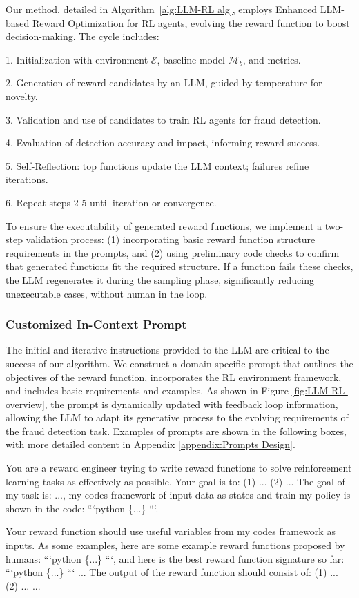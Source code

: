 \documentclass[11pt]{article}
\begin{document}
Our method, detailed in Algorithm~\ref{alg:LLM-RL alg}, employs Enhanced LLM-based Reward Optimization for RL agents, evolving the reward function to boost decision-making. The cycle includes:

1. Initialization with environment $\mathcal{E}$, baseline model $\mathcal{M}_b$, and metrics.

2. Generation of reward candidates by an LLM, guided by temperature for novelty.

3. Validation and use of candidates to train RL agents for fraud detection.

4. Evaluation of detection accuracy and impact, informing reward success.

5. Self-Reflection: top functions update the LLM context; failures refine iterations.

6. Repeat steps 2-5 until iteration or convergence.

To ensure the executability of generated reward functions, we implement a two-step validation process: (1) incorporating basic reward function structure requirements in the prompts, and (2) using preliminary code checks to confirm that generated functions fit the required structure. If a function fails these checks, the LLM regenerates it during the sampling phase, significantly reducing unexecutable cases, without human in the loop.

\subsubsection{Customized In-Context Prompt}

The initial and iterative instructions provided to the LLM are critical to the success of our algorithm. We construct a domain-specific prompt that outlines the objectives of the reward function, incorporates the RL environment framework, and includes basic requirements and examples. As shown in Figure \ref{fig:LLM-RL-overview}, the prompt is dynamically updated with feedback loop information, allowing the LLM to adapt its generative process to the evolving requirements of the fraud detection task. Examples of prompts are shown in the following boxes, with more detailed content in Appendix \ref{appendix:Prompts Design}.

\begin{tcolorbox}[title=Initial Instruction Prompts, colframe=gray, colback=white, breakable, fonttitle=\large\bfseries, fontupper=\small]
You are a reward engineer trying to write reward functions to solve reinforcement learning tasks as effectively as possible. Your goal is to:
(1) ...
(2) ...
The goal of my task is: ..., my codes framework of input data as states and train my policy is shown in the code: ```python \{...\} ```.

Your reward function should use useful variables from my codes framework as inputs. As some examples,
here are some example reward functions proposed by humans: ```python \{...\} ```,
and here is the best reward function signature so far: ```python \{...\} ```
...
The output of the reward function should consist of:
(1) ...
(2) ...
...
\end{tcolorbox}
\end{document}
